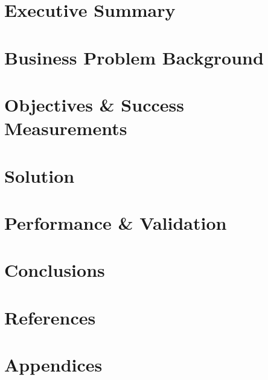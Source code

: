\documentclass[12pt]{article}
\begin{document}

\restoregeometry

\setcounter{tocdepth}{5}
\tableofcontents
\pagebreak


\justify

\section*{Executive Summary}

\pagebreak

\section{Business Problem Background}


\section{Objectives \& Success Measurements}


\section{Solution}


\section{Performance \& Validation}


\section{Conclusions}


\section{References}
\label{sec:ref}
\printbibliography[heading=none]

\clearpage

\appendix
\section*{Appendices}
\renewcommand{\thesubsection}{\Alph{subsection}}

\end{document}
